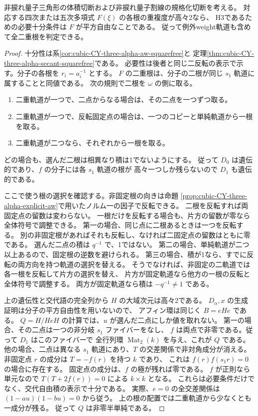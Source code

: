 \begin{theorem}\label{thm:cubic-CY-three-alpha-double-folded-roots}
非捩れ量子三角形の体積切断および非捩れ量子割線の規格化切断を考える。
対応する四次または五次多項式 $F(\xi)$ の各根の重複度が高々2なら、
H3であるための必要十分条件は $F$ が平方自由なことである。
従って例外weight軌道も含めて全二重根を判定できる。
\end{theorem}
\begin{proof}
十分性は系\ref{cor:cubic-CY-three-alpha-aw-squarefree}と
定理\ref{thm:cubic-CY-three-alpha-secant-squarefree}である。
必要性は後者と同じ二反転の表示で示す。分子の各根を $r_i=a_i^{-1}$ とする。
$F$ の二重根は、分子の二根が同じ $s_1$ 軌道に属することと同値である。
次の規則で二根を $\omega$ の側に取る。
\begin{enumerate}
\item 二重軌道が一つで、二点からなる場合は、その二点を一つずつ取る。
\item 二重軌道が一つで、反転固定点の場合は、一つのコピーと単純軌道から一根を取る。
\item 二重軌道が二つなら、それぞれから一根を取る。
\end{enumerate}
どの場合も、選んだ二根は相異なり積は1でないようにする。
従って $D_0$ は遺伝的であり、$f$ の分子には各 $s_1$ 軌道の根が
高々一つしか残らないので $D_1$ も遺伝的である。

ここで使う根の選択を確認する。非固定根の向きは命題
\ref{prop:cubic-CY-three-alpha-explicit-aw}で用いたノルム一の因子で反転できる。
二根を反転すれば両固定点の留数は変わらない。
一根だけを反転する場合も、片方の留数が零なら全体符号で調整できる。
第一の場合、同じ点に二根あるときは一つを反転する。
別の非固定根があればそれも反転し、なければ二固定点の留数はともに零である。
選んだ二点の積は $q^{-1}$ で、1ではない。
第二の場合、単純軌道が二つ以上あるので、固定根の逆数を避けられる。
第三の場合、積が1なら、すでに反転の両方向を持つ軌道の選択を替える。
そうでなければ、非固定の二軌道では各一根を反転して片方の選択を替え、
片方が固定軌道なら他方の一根の反転と全体符号で調整する。
両方が固定軌道なら積は $-q^{-1}\ne1$ である。

上の遺伝性と交代語の完全列から $H$ の大域次元は高々2である。
$D_\alpha,x$ の生成証明は分子の平方自由性を用いないので、
アフィン環は同じく $B=eHe$ である。
$Q=H/HeH$ の計算では、$u$ が選んだ二点にしか値を取れない。
第一の場合、その二点は一つの非分岐 $s_1$ ファイバーをなし、
$f$ は両点で非零である。従って $D_1$ はこのファイバーで
全行列環 $\operatorname{Mat}_2(k)$ を与え、これが $Q$ である。
他の場合、二点は異なる $s_1$ 軌道にあり、$T$ の交差関係で非対角成分が消える。
非固定点 $r$ の成分は $T=-f(r)$ を持つ $k$ であり、
これは $f(r)f(s_1r)=0$ の場合に存在する。
固定点の成分は、$f$ の極が残れば零である。
$f$ が正則なら単元なので $T(T+2f(r))=0$ による $k\times k$ となる。
これらは必要条件だけでなく、交代自由積の表示で十分である。
実際、$e=0$ の全交差関係は
$(1-au)(1-bu)=0$ から従う。
上の根の配置では二重軌道から少なくとも一成分が残る。
従って $Q$ は非零半単純である。


\end{proof}
